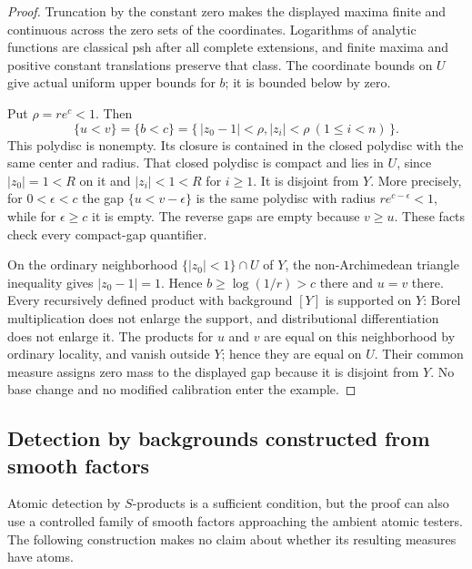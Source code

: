\documentclass[11pt,a4paper]{article}
\numberwithin{equation}{section}
\theoremstyle{definition}
\theoremstyle{remark}
\begin{document}
\begin{proof}
Truncation by the constant zero makes the displayed maxima finite and
continuous across the zero sets of the coordinates. Logarithms of
analytic functions are classical psh after all complete extensions,
and finite maxima and positive constant translations preserve that
class. The coordinate bounds on $U$ give actual uniform upper bounds
for $b$; it is bounded below by zero.

Put $\rho=re^c<1$. Then
\[
 \{u<v\}=\{b<c\}
  =\{\,|z_0-1|<\rho,
              |z_i|<\rho\ (1\leq i<n)\,\}.
\]
This polydisc is nonempty. Its closure is contained in the closed
polydisc with the same center and radius. That closed polydisc is
compact and lies in $U$, since $|z_0|=1<R$ on it and
$|z_i|<1<R$ for $i\geq1$.
It is disjoint from $Y$. More precisely, for $0<\epsilon<c$ the gap
$\{u<v-\epsilon\}$ is the same polydisc with radius
$re^{c-\epsilon}<1$, while for $\epsilon\geq c$ it is empty.
The reverse gaps are empty because $v\geq u$. These facts check every
compact-gap quantifier.

On the ordinary neighborhood $\{|z_0|<1\}\cap U$ of $Y$, the
non-Archimedean triangle inequality gives $|z_0-1|=1$. Hence
$b\geq\log(1/r)>c$ there and $u=v$ there. Every recursively defined
product with background $[Y]$ is supported on $Y$: Borel
multiplication does not enlarge the support, and distributional
differentiation does not enlarge it. The products for $u$ and $v$
are equal on this neighborhood by ordinary locality, and vanish
outside $Y$; hence they are equal on $U$. Their common measure assigns
zero mass to the displayed gap because it is disjoint from $Y$.
No base change and no modified calibration enter the example.
\end{proof}

\subsection{Detection by backgrounds constructed from smooth factors}
\label{subsec:r2-smooth-factor-detection}

Atomic detection by $S$-products is a sufficient condition, but the
proof can also use a controlled family of smooth factors approaching
the ambient atomic testers. The following construction makes no claim
about whether its resulting measures have atoms.
\end{document}
